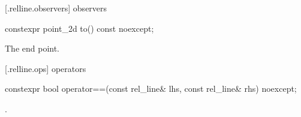  [\iotwod.relline.observers]{ observers}

%
\begin{itemdecl}
constexpr point_2d to() const noexcept;
\end{itemdecl}
\begin{itemdescr}
\pnum
\returns
The end point.
\end{itemdescr}

 [\iotwod.relline.ops]{ operators}

%
\begin{itemdecl}
constexpr bool operator==(const rel_line& lhs, const rel_line& rhs) noexcept;
\end{itemdecl}
\begin{itemdescr}
\pnum
\returns
{}.
\end{itemdescr}

